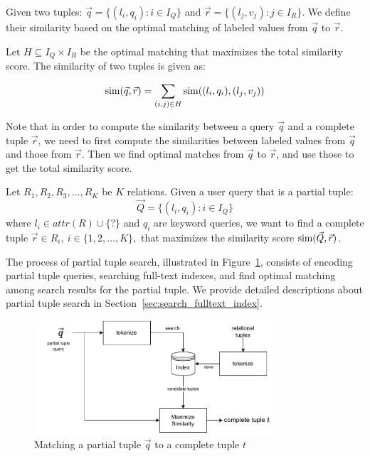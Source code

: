 \begin{definition}
Given two tuples: $\vec q=\{(l_i, q_i): i\in I_Q\}$ and
$\vec r=\{(l_j, v_j): j\in I_R\}$.  We define their similarity based on
the optimal matching of labeled values from $\vec q$ to $\vec r$.

Let $H\subseteq I_Q\times I_R$ be the optimal matching that maximizes the total similarity score. 
The similarity of two tuples is given as:

$$\mathrm{sim}(\vec q, \vec r) = \sum_{(i,j)\in H}\mathrm{sim}((l_i, q_i), (l_j, v_j))$$
\end{definition}

Note that in order to compute the similarity between a query $\vec q$ and
a complete tuple $\vec r$, we need to first compute the similarities
between labeled values from $\vec q$ and those from $\vec r$. 
Then we find optimal matches from $\vec q$ to $\vec r$, and use those to get the total similarity score.

\begin{definition}
Let $R_1, R_2, R_3, \dots, R_K$ be $K$ relations. 
Given a user query that is a partial tuple: $$\vec Q = \{(l_i, q_i): i\in I_Q\}$$ 
where $l_i \in attr(R)\cup\{?\}$ and $q_i$ are keyword queries, 
we want to find a complete tuple $\vec r \in R_i,\ i\in\{1, 2, \dots, K\},$ that maximizes the similarity score
$\mathrm{sim}(\vec Q, \vec r)$.
\end{definition}

The process of  partial tuple search, illustrated in Figure~\ref{fig:tuple_completion}, consists of encoding partial tuple queries, searching full-text indexes, and find optimal matching among search results for the partial tuple. We provide detailed descriptions about partial tuple search in Section~\ref{sec:search_fulltext_index}.
\begin{figure}[!th]
	\centering
	\includegraphics[width=0.8\textwidth]{my/graphics/tuple_completion.pdf}
	\caption{Matching a partial tuple $\vec{q}$ to a complete tuple $t$}
	\label{fig:tuple_completion}
\end{figure}

